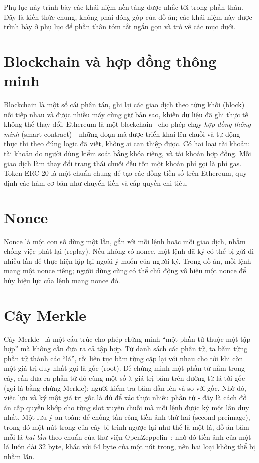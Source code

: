 \documentclass[../DoAn.tex]{subfiles}
\begin{document}
Phụ lục này trình bày các khái niệm nền tảng được nhắc tới trong phần thân. Đây là kiến thức chung, không phải đóng góp của đồ án; các khái niệm này được trình bày ở phụ lục để phần thân tóm tắt ngắn gọn và trỏ về các mục dưới.

\section{Blockchain và hợp đồng thông minh}
\label{apdx:blockchain}

Blockchain là một sổ cái phân tán, ghi lại các giao dịch theo từng khối (block) nối tiếp nhau và được nhiều máy cùng giữ bản sao, khiến dữ liệu đã ghi thực tế không thể thay đổi. Ethereum là một blockchain~\cite{wood2014ethereum} cho phép chạy \emph{hợp đồng thông minh} (smart contract) - những đoạn mã được triển khai lên chuỗi và tự động thực thi theo đúng logic đã viết, không ai can thiệp được. Có hai loại tài khoản: tài khoản do người dùng kiểm soát bằng khóa riêng, và tài khoản hợp đồng. Mỗi giao dịch làm thay đổi trạng thái chuỗi đều tốn một khoản phí gọi là phí gas. Token ERC-20 là một chuẩn chung để tạo các đồng tiền số trên Ethereum, quy định các hàm cơ bản như chuyển tiền và cấp quyền chi tiêu.

\section{Nonce}
\label{apdx:nonce}

Nonce là một con số dùng một lần, gắn với mỗi lệnh hoặc mỗi giao dịch, nhằm chống việc phát lại (replay). Nếu không có nonce, một lệnh đã ký có thể bị gửi đi nhiều lần để thực hiện lặp lại ngoài ý muốn của người ký. Trong đồ án, mỗi lệnh mang một nonce riêng; người dùng cũng có thể chủ động vô hiệu một nonce để hủy hiệu lực của lệnh mang nonce đó.

\section{Cây Merkle}
\label{apdx:merkle}

Cây Merkle~\cite{merkle1987digital} là một cấu trúc cho phép chứng minh ``một phần tử thuộc một tập hợp'' mà không cần đưa ra cả tập hợp. Từ danh sách các phần tử, ta băm từng phần tử thành các ``lá'', rồi liên tục băm từng cặp lại với nhau cho tới khi còn một giá trị duy nhất gọi là gốc (root). Để chứng minh một phần tử nằm trong cây, cần đưa ra phần tử đó cùng một số ít giá trị băm trên đường từ lá tới gốc (gọi là bằng chứng Merkle); người kiểm tra băm dần lên và so với gốc. Nhờ đó, việc lưu và ký một giá trị gốc là đủ để xác thực nhiều phần tử - đây là cách đồ án cấp quyền khớp cho từng slot xuyên chuỗi mà mỗi lệnh được ký một lần duy nhất. Một lưu ý an toàn: để chống tấn công tiền ảnh thứ hai (second-preimage), trong đó một nút trong của cây bị trình ngược lại như thể là một lá, đồ án băm mỗi lá \emph{hai lần} theo chuẩn của thư viện OpenZeppelin~\cite{openzeppelin_contracts}; nhờ đó tiền ảnh của một lá luôn dài 32 byte, khác với 64 byte của một nút trong, nên hai loại không thể bị nhầm lẫn.
\end{document}
